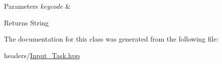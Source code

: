 \begin{DoxyParams}{Parameters}
{\em keycode} & \\
\hline
\end{DoxyParams}
\begin{DoxyReturn}{Returns}
String 
\end{DoxyReturn}


The documentation for this class was generated from the following file\+:\begin{DoxyCompactItemize}
\item 
headers/\mbox{\hyperlink{_input___task_8hpp}{Input\+\_\+\+Task.\+hpp}}\end{DoxyCompactItemize}
